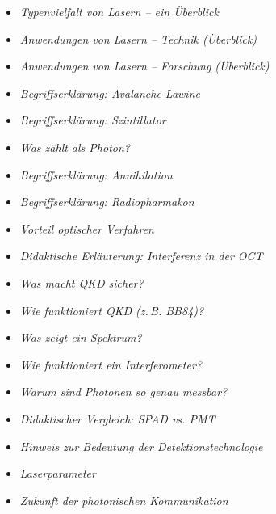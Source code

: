 \begin{tcolorbox}[title=didaktische Boxen, didaktikbox]
	\begin{itemize}
		\item \emph{Typenvielfalt von Lasern – ein Überblick} \dotfill\pageref{box:Typenvielfalt von Lasern}
		\item \emph{Anwendungen von Lasern  – \newline Technik (Überblick)} \dotfill\pageref{box:lasertechnik}
		\item \emph{Anwendungen von Lasern  – \newline Forschung (Überblick)}\dotfill\pageref{box:laser-app-forschung}
		\item \emph{Begriffserklärung: Avalanche-Lawine} \dotfill\pageref{box:avalanche}
		\item \emph{Begriffserklärung: Szintillator} \dotfill\pageref{box:szintillator}
		\item \emph{Was zählt als Photon?} \dotfill\pageref{box:photonenzaehlung}
		\item \emph{Begriffserklärung: Annihilation} \dotfill\pageref{box:annihilation}
		\item \emph{Begriffserklärung: Radiopharmakon} \dotfill\pageref{box:radiopharmakon}
		\item \emph{Vorteil optischer Verfahren} \dotfill\pageref{box:optisches Verfahren}
		\item \emph{Didaktische Erläuterung: Interferenz in der OCT} \dotfill\pageref{box:interferenz_oct}
		\item \emph{Was macht QKD sicher?} \dotfill\pageref{box:qkd}
		\item \emph{Wie funktioniert QKD (z.\,B. BB84)?} \dotfill\pageref{box:wie funktioniert QKD}
		\item \emph{Was zeigt ein Spektrum?} \dotfill\pageref{box:was zeigt spektrum}
		\item \emph{Wie funktioniert ein Interferometer?}\dotfill\pageref{box:interferometer}
		\item \emph{Warum sind Photonen so genau messbar?} \dotfill\pageref{box:photonen_genau}
	\end{itemize}
\end{tcolorbox}
\vspace{1em}
\begin{tcolorbox}[title=Hinweis-Boxen, hinweisbox]
	\begin{itemize}
		\item \emph{Didaktischer Vergleich: SPAD vs. PMT} \dotfill\pageref{box:vergleich SPAD}
		\item \emph{Hinweis zur Bedeutung der Detektionstechnologie} \dotfill\pageref{box:detektionstechnologie}
		\item \emph{Laserparameter}\dotfill\pageref{box:laserparameter}
		\item \emph{Zukunft der photonischen Kommunikation} \dotfill\pageref{box:Zukunft Kommunikation}
	\end{itemize}
\end{tcolorbox}




